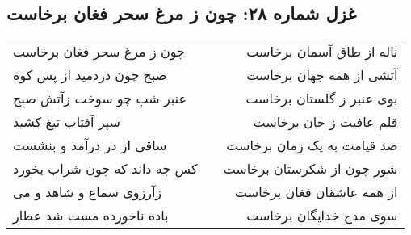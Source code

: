 \begin{center}
\section*{غزل شماره ۲۸: چون ز مرغ سحر فغان برخاست}
\label{sec:028}
\begin{longtable}{l p{0.5cm} r}
چون ز مرغ سحر فغان برخاست
&&
ناله از طاق آسمان برخاست
\\
صبح چون دردمید از پس کوه
&&
آتشی از همه جهان برخاست
\\
عنبر شب چو سوخت زآتش صبح
&&
بوی عنبر ز گلستان برخاست
\\
سپر آفتاب تیغ کشید
&&
قلم عافیت ز جان برخاست
\\
ساقی از در درآمد و بنشست
&&
صد قیامت به یک زمان برخاست
\\
کس چه داند که چون شراب بخورد
&&
شور چون از شکرستان برخاست
\\
زآرزوی سماع و شاهد و می
&&
از همه عاشقان فغان برخاست
\\
باده ناخورده مست شد عطار
&&
سوی مدح خدایگان برخاست
\\
\end{longtable}
\end{center}
